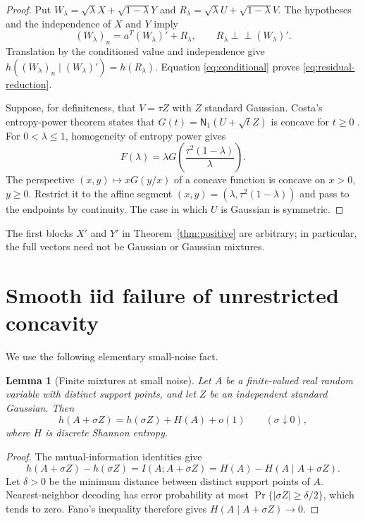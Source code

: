\documentclass[11pt]{article}
\newtheorem{lemma}{Lemma}
\newcommand{\N}{\mathsf N}
\newcommand{\ind}{\mathrel{\perp\!\!\!\perp}}
\begin{document}
\begin{proof}
Put $W_\lambda=\sqrt\lambda X+\sqrt{1-\lambda}Y$ and
$R_\lambda=\sqrt\lambda U+\sqrt{1-\lambda}V$. The hypotheses and the
independence of $X$ and $Y$ imply
\[
 (W_\lambda)_n=a^T(W_\lambda)'+R_\lambda,
 \qquad R_\lambda\ind (W_\lambda)'.
\]
Translation by the conditioned value and independence give
$h((W_\lambda)_n\mid(W_\lambda)')=h(R_\lambda)$. Equation
\eqref{eq:conditional} proves \eqref{eq:residual-reduction}.

Suppose, for definiteness, that $V=\tau Z$ with $Z$ standard Gaussian.
Costa's entropy-power theorem states that
$G(t)=\N_1(U+\sqrt t Z)$ is concave for $t\geq0$ \cite{Costa}. For
$0<\lambda\leq1$, homogeneity of entropy power gives
\[
 F(\lambda)
 =\lambda G\!\left(\frac{\tau^2(1-\lambda)}{\lambda}\right).
\]
The perspective $(x,y)\mapsto xG(y/x)$ of a concave function is concave on
$x>0$, $y\geq0$. Restrict it to the affine segment
$(x,y)=(\lambda,\tau^2(1-\lambda))$ and pass to the endpoints by continuity.
The case in which $U$ is Gaussian is symmetric.
\end{proof}

The first blocks $X'$ and $Y'$ in Theorem~\ref{thm:positive} are arbitrary;
in particular, the full vectors need not be Gaussian or Gaussian mixtures.

\section{Smooth iid failure of unrestricted concavity}

We use the following elementary small-noise fact.

\begin{lemma}[Finite mixtures at small noise]\label{lem:small-noise}
Let $A$ be a finite-valued real random variable with distinct support points,
and let $Z$ be an independent standard Gaussian. Then
\[
 h(A+\sigma Z)=h(\sigma Z)+H(A)+o(1)\qquad(\sigma\downarrow0),
\]
where $H$ is discrete Shannon entropy.
\end{lemma}

\begin{proof}
The mutual-information identities give
\[
 h(A+\sigma Z)-h(\sigma Z)
 =I(A;A+\sigma Z)=H(A)-H(A\mid A+\sigma Z).
\]
Let $\delta>0$ be the minimum distance between distinct support points of
$A$. Nearest-neighbor decoding has error probability at most
$\Pr\{|\sigma Z|\geq\delta/2\}$, which tends to zero. Fano's inequality
therefore gives $H(A\mid A+\sigma Z)\to0$.
\end{proof}
\end{document}
